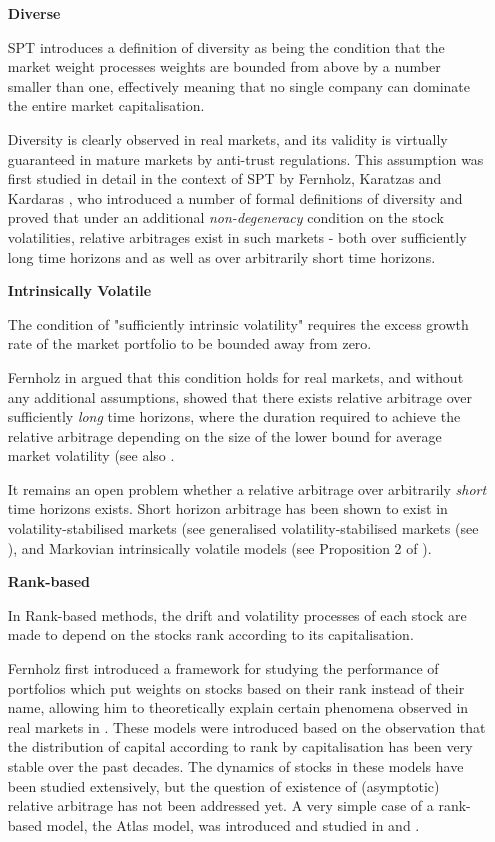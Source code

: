 \documentclass[british]{amsart} \usepackage{lmodern}
\numberwithin{equation}{section} \numberwithin{figure}{section}
\theoremstyle{plain} \newtheorem{thm}{\protect\theoremname}[section]
\theoremstyle{definition} \newtheorem{defn}[thm]{\protect\definitionname}
\theoremstyle{plain} \newtheorem{assumption}[thm]{\protect\assumptionname}
\theoremstyle{plain} \newtheorem{lem}[thm]{\protect\lemmaname}
\theoremstyle{plain} \newtheorem{prop}[thm]{\protect\propositionname}
\theoremstyle{remark} \newtheorem{rem}[thm]{\protect\remarkname}
\theoremstyle{plain} \newtheorem{cor}[thm]{\protect\corollaryname}
\begin{document}
\begin{enumerate}

\item[\textbf{Diverse}] 

SPT introduces a definition of diversity as being the condition that the market
weight processes weights are bounded from above by a number smaller than one,
effectively meaning that no single company can dominate the entire market
capitalisation.

Diversity is clearly observed in real markets, and its validity is virtually
guaranteed in mature markets by anti-trust regulations. This assumption was
first studied in detail in the context of SPT by Fernholz, Karatzas and Kardaras
\cite{fernholz2005}, who introduced a number of formal definitions of diversity 
and proved that under an additional \textit{non-degeneracy} condition on the 
stock volatilities, relative arbitrages exist in such markets - both over
sufficiently long time horizons and as well as over arbitrarily short time
horizons.

\item[\textbf{Intrinsically Volatile}]

The condition of "sufficiently intrinsic volatility" requires the excess growth
rate of the market portfolio to be bounded away from zero.

Fernholz in \cite{fernholz2002} argued that this condition holds for real
markets, and without any additional assumptions, showed that there exists
relative arbitrage over sufficiently \textit{long} time horizons, where the
duration required to achieve the relative arbitrage depending on the size 
of the lower bound for average market volatility (see
also \cite{fernholz2005relative}.

It remains an open problem whether a relative arbitrage over arbitrarily
\textit{short} time horizons exists. Short horizon arbitrage  has been shown to
exist in volatility-stabilised markets (see \cite{banner2008short} generalised
volatility-stabilised markets (see \cite{pickova2014generalized}), and Markovian
intrinsically volatile models (see Proposition 2 of \cite{fernholz2009}).

\item[\textbf{Rank-based}] 

In Rank-based methods, the drift and volatility processes of each stock
are made to depend on the stocks rank according to its capitalisation.

Fernholz first introduced a framework for studying the performance of portfolios
which put weights on stocks based on their rank instead of their name, allowing
him to theoretically explain certain phenomena observed in real markets in
\cite{fernholz2002}. These models were introduced based on the observation that
the distribution of capital according to rank by capitalisation has been very
stable over the past decades. The dynamics of stocks in these models have
been studied extensively, but the question of existence of (asymptotic) relative
arbitrage has not been addressed yet. A very simple case of a rank-based model,
the Atlas model, was introduced and studied in \cite{banner2005atlas} and
\cite{ichiba2011hybrid}.


\end{enumerate}
\end{document}
